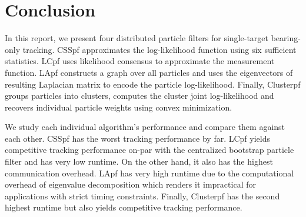 \documentclass[10pt,letterpaper,final]{article}
\begin{document}
\section{Conclusion}
\label{sec:conclusion}
In this report, we present four distributed particle filters for single-target bearing-only tracking. CSSpf approximates the log-likelihood function using six sufficient statistics. LCpf uses likelihood consensus to approximate the measurement function. LApf constructs a graph over all particles and uses the eigenvectors of resulting Laplacian matrix to encode the particle log-likelihood. Finally, Clusterpf groups particles into clusters, computes the cluster joint log-likelihood and recovers individual particle weights using convex minimization. 

We study each individual algorithm's performance and compare them against each other. CSSpf has the worst tracking performance by far. LCpf yields competitive tracking performance on-par with the centralized bootstrap particle filter and has very low runtime. On the other hand, it also has the highest communication overhead. LApf has very high runtime due to the computational overhead of eigenvalue decomposition which renders it impractical for applications with strict timing constraints. Finally, Clusterpf has the second highest runtime but also yields competitive tracking performance. 



\end{document}
